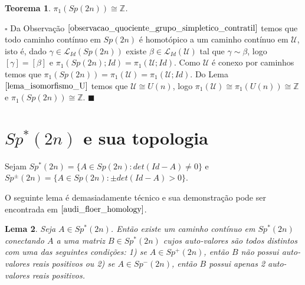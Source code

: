 \documentclass[12pt]{book}
\newtheorem{teorema}{Teorema}[section]
\newtheorem{lema}[teorema]{Lema}
\newenvironment{prova}[1]{$\square$ #1}{\hfill$\blacksquare$}
\newcommand{\caminhos}{\mathcal{L}}
\newcommand{\caminhospontobasegeral}[2]{\caminhos_{#1}(#2)}
\newcommand{\classe}[1]{[#1]}
\newcommand{\grupofundamental}[1]{\pi_{1}(#1)}
\newcommand{\grupofundamentalpontobase}[2]{\pi_{1}(#1; #2)}
\newcommand{\gruposimpletico}[1]{Sp(#1)}
\newcommand{\gruposimpleticonaodegenerado}[1]{Sp^{#1}(2n)}
\newcommand{\inteiros}{\mathbb{Z}}
\newcommand{\matrizSimpleticaOrtogonal}{\mathcal{U}}
\newcommand{\matrizunitaria}[1]{U(#1)}
\begin{document}
	\begin{teorema}
		$\grupofundamental{\gruposimpletico{2n}} \cong \inteiros$.
	\end{teorema}
	\begin{prova}
		Da Observação $\ref{observacao_quociente_grupo_simpletico_contratil}$ temos que todo caminho contínuo em $\gruposimpletico{2n}$ é homotópico a um caminho contínuo em $\matrizSimpleticaOrtogonal$, isto é, dado $\gamma \in \caminhospontobasegeral{Id }{\gruposimpletico{2n}}$ existe $\beta \in \caminhospontobasegeral{Id}{\matrizSimpleticaOrtogonal}$ tal que $\gamma \sim \beta$, logo $\classe{\gamma} = \classe{\beta}$ e 
		$\grupofundamentalpontobase{\gruposimpletico{2n}}{Id} = \grupofundamentalpontobase{\matrizSimpleticaOrtogonal}{Id}$. Como $\matrizSimpleticaOrtogonal$ é conexo por caminhos temos que $\grupofundamental{\gruposimpletico{2n}} =\grupofundamental{\matrizSimpleticaOrtogonal}= \grupofundamentalpontobase{\matrizSimpleticaOrtogonal}{Id}$. Do Lema $\ref{lema_isomorfismo_U}$ temos que $\matrizSimpleticaOrtogonal\cong \matrizunitaria{n}$, logo $\grupofundamental{\matrizSimpleticaOrtogonal} \cong \grupofundamental{\matrizunitaria{n}} \cong \inteiros$ e $\grupofundamental{\gruposimpletico{2n}} \cong \inteiros$.
	\end{prova}
	
	\section{$\gruposimpleticonaodegenerado{*}$ e sua topologia}\label{secao_grupo_simpletico_nao_degenerado}
	
	Sejam $\gruposimpleticonaodegenerado{*} = \{ A \in \gruposimpletico{2n}: det(Id-A)\neq 0 \}$ e $\gruposimpleticonaodegenerado{\pm} = \{ A \in \gruposimpletico{2n}: \pm det(Id-A)> 0 \}$.
	
	O seguinte lema é demasiadamente técnico e sua demonstração pode ser encontrada em $\cite{audi_floer_homology}$.
	
	\begin{lema}\label{lema_conectividade_grupo_simlpetico_nao_degenerado}
		Seja $A\in \gruposimpleticonaodegenerado{*}$. Então existe um caminho contínuo em $\gruposimpleticonaodegenerado{*}$ conectando $A$ a uma matriz $B \in \gruposimpleticonaodegenerado{*}$ cujos  auto-valores são todos distintos com uma das seguintes condições: 1) se $A\in \gruposimpleticonaodegenerado{+}$, então $B$ não possui auto-valores reais positivos ou 2) se $A\in \gruposimpleticonaodegenerado{-}$, então $B$ possui apenas 2 auto-valores reais positivos.
	\end{lema}
	
\end{document}
